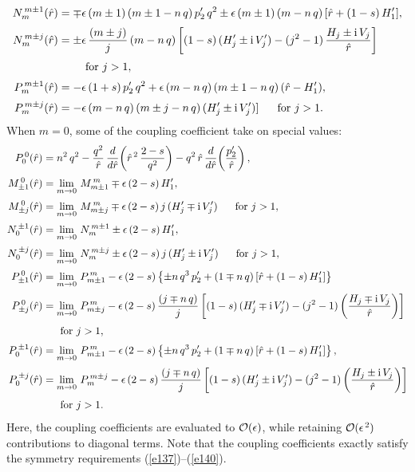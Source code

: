 \documentclass[12pt,prb,aps]{revtex4-1}
\begin{document}
\begin{align}
N_m^{\,m\pm 1}(\hat{r}) &= \mp \epsilon\,(m\pm 1)\,(m\pm 1-n\,q)\,p_2'\,q^2\pm \epsilon\,(m\pm 1)\,(m-n\,q)\,[\hat{r}+ (1-s)\,H_1'],\\[0.5ex]
N_m^{\,m\pm j}(\hat{r}) &= \pm \epsilon\,\frac{(m\pm j)}{j}\,(m-n\,q)\left[(1-s)\,(H_j'\pm {\rm i}\,V_j')-(j^2-1)\,\frac{H_j\pm{\rm i}\, V_j}{\hat{r}}\right]\nonumber\\[0.5ex]&\phantom{=}\mbox{~~~~~for $j>1$},\\[0.5ex]
P_m^{\,m\pm 1}(\hat{r})&= -\epsilon\,(1+s)\,p_2'\,q^2+ \epsilon\,(m-n\,q)\,(m\pm 1-n\,q)\,(\hat{r}-H_1'),\\[0.5ex]
P_m^{\,m\pm j}(\hat{r})&= -\epsilon\,(m-n\,q)\,(m\pm j-n\,q)\,(H_j' \pm {\rm i} \,V_j')]\mbox{~~~~~for $j>1$}.
\end{align}
When $m=0$, some of the coupling coefficient take on special values: 
\begin{align}
P_0^{\,0}(\hat{r})&=n^2\,q^2-\frac{q^2}{\hat{r}}\,\frac{d}{d\hat{r}}\!\left(\hat{r}^{\,2}\,\frac{2-s}{q^2}\right)-q^2\,\hat{r}\,\frac{d}{d\hat{r}}\!\left(
\frac{p_2'}{\hat{r}}\right),\\[0.5ex]
M_{\pm 1}^{\,0}(\hat{r}) &= \lim_{m\rightarrow 0}\,M_{m\pm 1}^{\,m} \mp\epsilon\,(2-s)\,H_1',\\[0.5ex]
M_{\pm j}^{\,0}(\hat{r}) &= \lim_{m\rightarrow 0}\,M_{m\pm j}^{\,m} \mp\epsilon\,(2-s)\,j\,(H_j'\mp{\rm i}\,V_j')\mbox{~~~~~for $j>1$},\\[0.5ex]
N_0^{\,\pm 1}(\hat{r}) &= \lim_{m\rightarrow 0}\,N_m^{\,m\pm 1} \pm\epsilon\,(2-s)\,H_1',\\[0.5ex]
N_0^{\,\pm j}(\hat{r}) &= \lim_{m\rightarrow 0}\,N_m^{\,m\pm j} \pm\epsilon\,(2-s)\,j\,(H_j'\pm{\rm i}\,V_j')\mbox{~~~~~for $j>1$},\\[0.5ex]
P_{\pm 1}^{\,0}(\hat{r})&= \lim_{m\rightarrow 0}\,P_{m\pm 1}^{\,m}-\epsilon\,(2-s)\left\{\pm n\,q^3\,p_2'+(1\mp n\,q)\left[\hat{r}+(1-s)\,H_1'\right]\right\}\\[0.5ex]
P_{\pm j}^{\,0}(\hat{r}) & =\lim_{m\rightarrow 0}\,P_{m\pm j}^{\,m}-\epsilon\,(2-s)\,\frac{(j\mp n\,q)}{j}
\left[(1-s)\,(H_j'\mp{\rm i}\,V_j')-(j^2-1)\left(\frac{H_j\mp {\rm i}\,V_j}{\hat{r}}\right)\right]\nonumber\\[0.5ex]&\mbox{~~~~~for $j>1$},\\[0.5ex]
P_0^{\,\pm 1}(\hat{r})&= \lim_{m\rightarrow 0}\,P_{m\pm 1}^{\,m}-\epsilon\,(2-s)\left\{\pm n\,q^3\,p_2'+(1\mp n\,q)\left[\hat{r}+(1-s)\,H_1'\right]\right\},\\[0.5ex]
P_0^{\,\pm j}(\hat{r})&=\lim_{m\rightarrow 0}\,P_m^{\,m\pm j}-\epsilon\,(2-s)\,\frac{(j\mp n\,q)}{j}
\left[(1-s)\,(H_j'\pm {\rm i}\,V_j')-(j^2-1)\left(\frac{H_j\pm {\rm i}\,V_j}{\hat{r}}\right)\right]\nonumber\\[0.5ex]&\mbox{~~~~~for $j>1$}.
\end{align}
Here, the coupling coefficients are evaluated to ${\cal O}(\epsilon)$, while retaining ${\cal O}(\epsilon^{\,2})$ contributions to diagonal terms.\cite{connor,am1}
Note that the coupling coefficients exactly satisfy the symmetry requirements (\ref{e137})--(\ref{e140}).
\end{document}
